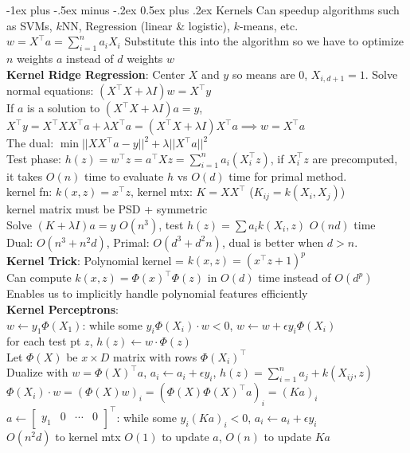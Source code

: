 \documentclass[10pt,landscape]{article}
\makeatletter
\renewcommand{\section}{\@startsection{section}{1}{0mm}%
                                {-1ex plus -.5ex minus -.2ex}%
                                {0.5ex plus .2ex}%
                                {\normalfont\large\bfseries}}
\makeatother
\begin{document}
\begin{multicols}{3}
\section{$\boxed{\text{Kernels}}$}
Can speedup algorithms such as SVMs, $k$NN, Regression (linear \& logistic), $k$-means, etc.
\\
$w = X^\top a = \sum_{i=1}^n a_i X_i$
Substitute this into the algorithm so we have to optimize $n$ weights $a$ instead of $d$ weights $w$ \\
\textbf{Kernel Ridge Regression}: Center $X$ and $y$ so means are 0, $X_{i, d+1} = 1$. Solve normal equations: $(X^\top X + \lambda I)w = X^\top y$\\
If $a$ is a solution to $(X^\top X + \lambda I) a = y$, $X^\top y = X^\top X X^\top a + \lambda X^\top a = (X^\top X + \lambda I) X^\top a \implies w = X^\top a$\\
The dual: $\min ||X X^\top a - y||^2 + \lambda ||X^\top a||^2$\\
Test phase: $h(z) = w^\top z = a^\top X z = \sum_{i=1}^n a_i(X_i^\top z)$, if $X_i^\top z$ are precomputed, it takes $O(n)$ time to evaluate $h$ vs $O(d)$ time for primal method. \\
kernel fn: $k(x, z) = x^\top z$, kernel mtx: $K = X X^\top$ ($K_{ij} = k(X_i, X_j)$)\\
kernel matrix must be PSD + symmetric
\\
Solve $(K+\lambda I)a=y$ $O(n^3)$, test $h(z) = \sum a_i k(X_i, z)$ $O(nd)$ time \\
Dual: $O(n^3 + n^2 d)$, Primal: $O(d^3 + d^2 n)$, dual is better when $d>n$.\\
\textbf{Kernel Trick}: Polynomial kernel = $k(x, z) = (x^\top z + 1)^p$ \\
Can compute $k(x, z) = \Phi(x)^\top \Phi(z)$ in $O(d)$ time instead of $O(d^p)$\\
Enables us to implicitly handle polynomial features efficiently \\
\textbf{Kernel Perceptrons}:\\
$w \leftarrow y_1 \Phi(X_1)$: while some $y_i \Phi(X_i) \cdot w < 0$, $w \leftarrow w + \epsilon y_i \Phi(X_i)$ \\
for each test pt $z$, $h(z) \leftarrow w \cdot \Phi(z)$\\
Let $\Phi(X)$ be $x \times D$ matrix with rows $\Phi(X_i)^\top$ \\
Dualize with $w = \Phi(X)^\top a$, $a_i \leftarrow a_i + \epsilon y_i$, $h(z) = \sum_{i=1}^n a_j + k(X_{ij}, z)$ \\
$\Phi(X_i) \cdot w = (\Phi(X) w)_i = (\Phi(X) \Phi(X)^\top a)_i = (Ka)_i$\\
$a \leftarrow \begin{bmatrix}
y_1 & 0 & \cdots & 0
\end{bmatrix}^\top$: while some $y_i(Ka)_i < 0$, $a_i \leftarrow a_i + \epsilon y_i$\\
$O(n^2 d)$ to kernel mtx $O(1)$ to update $a$, $O(n)$ to update $Ka$


\end{multicols}
\end{document}
